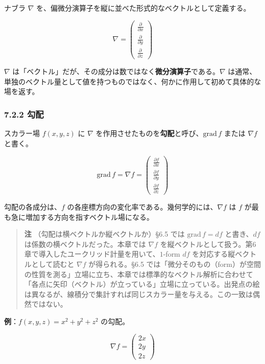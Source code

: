 \documentclass[a4paper,12pt,openany]{book}
\begin{document}
ナブラ \(\nabla\)
を、偏微分演算子を縦に並べた形式的なベクトルとして定義する。

\[\nabla = \begin{pmatrix}
\frac{\partial}{\partial x} \\[0.5em]
\frac{\partial}{\partial y} \\[0.5em]
\frac{\partial}{\partial z}
\end{pmatrix}\]

\(\nabla\)
は「ベクトル」だが、その成分は数ではなく\textbf{微分演算子}である。\(\nabla\)
は通常、単独のベクトル量として値を持つものではなく、何かに作用して初めて具体的な場を返す。

\hypertarget{ux52feux914d}{%
\subsubsection{7.2.2 勾配}\label{ux52feux914d}}

スカラー場 \(f(x,y,z)\) に \(\nabla\)
を作用させたものを\textbf{勾配}と呼び、\(\mathrm{grad}\,f\) または
\(\nabla f\) と書く。

\[\mathrm{grad}\,f = \nabla f = \begin{pmatrix}
\frac{\partial f}{\partial x} \\[0.5em]
\frac{\partial f}{\partial y} \\[0.5em]
\frac{\partial f}{\partial z}
\end{pmatrix}\]

勾配の各成分は、\(f\)
の各座標方向の変化率である。幾何学的には、\(\nabla f\) は \(f\)
が最も急に増加する方向を指すベクトル場になる。

\begin{quote}
\textbf{注} （勾配は横ベクトルか縦ベクトルか）§6.5 では
\(\mathrm{grad}\,f = df\) と書き、\(df\)
は係数の横ベクトルだった。本章では \(\nabla f\)
を縦ベクトルとして扱う。第6章で導入したユークリッド計量を用いて、\(1\)-form
\(df\) を対応する縦ベクトルとして読むと \(\nabla f\) が得られる。§6.5
では「微分そのもの（form）が空間の性質を測る」立場に立ち、本章では標準的なベクトル解析に合わせて「各点に矢印（ベクトル）が立っている」立場に立っている。出発点の絵は異なるが、線積分で集計すれば同じスカラー量を与える。この一致は偶然ではない。
\end{quote}

\textbf{例}：\(f(x,y,z) = x^2 + y^2 + z^2\) の勾配。

\[\nabla f = \begin{pmatrix} 2x \\ 2y \\ 2z \end{pmatrix}\]
\end{document}
